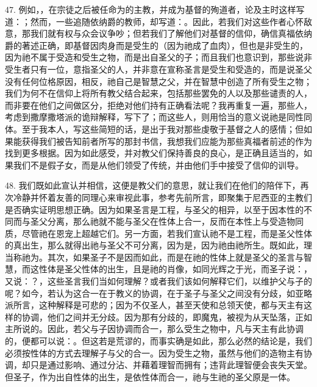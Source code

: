 47. 例如，，在宗徒之后被任命为的主教，并成为基督的殉道者，论及主时这样写道：；然而，一些追随依纳爵的教师，却写道：。因此，若我们对这些作者心怀敌意，那我们就有权与众会议争吵；但若我们了解他们对基督的信仰，确信真福依纳爵的著述正确，即基督因肉身而是受生的（因为祂成了血肉），但也是非受生的，因为祂不属于受造和受生之物，而是出自圣父的子；而且我们也意识到，那些说非受生者只有一位，意指圣父的人，并非意在宣称圣言是受生和受造的，而是说圣父没有任何位格原因，相反，祂自己是智慧之父，并在智慧中创造了所有受生之物；我们为何不在信仰上将所有教父结合起来，包括那些罢免的人以及那些谴责的人，而非要在他们之间做区分，拒绝对他们持有正确看法呢？我再重复一遍，那些人，考虑到撒摩撒塔派的诡辩解释，写下了；而这些人，则用恰当的意义说祂是同性同体。至于我本人，写这些简短的话，是出于我对那些虔敬于基督之人的感情；但如果能获得我们被告知前者所写的那封书信，我想我们应能为那些真福者前述的作为找到更多根据。因为如此感受，并对教父们保持善良的良心，是正确且适当的，如果我们不是假子女，而是从他们领受了传统，并由他们手中接受了信仰的训导。\par

48. 我们既如此宣认并相信，这便是教父们的意思，就让我们在他们的陪伴下，再次冷静并怀着友善的同理心来审视此事，参考先前所言，即聚集于尼西亚的主教们是否确实证明思想正确。因为如果圣言是工程，与圣父的相异，以至于因本性的不同而与圣父分离，那么祂就不能与圣父在性体上合一，反而在本性上与受造物同质，尽管祂在恩宠上超越它们。另一方面，若我们宣认祂不是工程，而是圣父性体的真出生，那么就得出祂与圣父不可分离，因为是，因为祂由祂所生。既如此，理当称祂为。其次，如果圣子不是因而如此，而是在祂的性体上就是圣父的圣言与智慧，而这性体是圣父性体的出生，且是祂的肖像，如同光辉之于光，而圣子说：，又说：？，这些圣言我们当如何理解？或者我们该如何解释它们，以维护父与子的呢？如今，若认为这合一在于教义的协调，在于圣子与圣父之间没有分歧，如亚略派所言，这种解释是可悲的；因为不仅圣人，甚至天使和总领天使，都与天主有这样的协调，他们之间并无分歧。因为那有分歧的，即魔鬼，被视为从天坠落，正如主所说的。因此，若父与子因协调而合一，那么受生之物中，凡与天主有此协调的，便都可以说：。但这若是荒谬的，而事实确是如此，那么必然的结论是，我们必须按性体的方式去理解子与父的合一。因为受生之物，虽然与他们的造物主有协调，却只是通过影响、通过分沾、并藉着理智而拥有；违背此理智便会丧失天堂。但圣子，作为出自性体的出生，是依性体而合一，祂与生祂的圣父原是一体。\par

